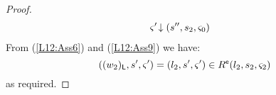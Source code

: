\begin{lemma}[]
\begin{proof}
\begin{align}
%
	& \extendsAM{\amod{}'}{s''}{s_2}{\amod{0}}  \label{L12:Ass10}
\end{align}
%
From (\ref{L12:Ass6}) and (\ref{L12:Ass9}) we have:
%
\begin{equation}
	((w_2)_{\textsf{L}}, s', \varsigma_{}') = (l_2, s', \varsigma_{}') \in R^{\textsf{e}}(l_2, s_2, \varsigma_{2}) \nonumber
\end{equation}
% 
as required.
\end{proof}
%
%
\end{lemma}
%
%
